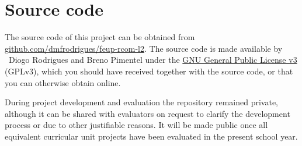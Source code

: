 \documentclass[a4paper, 11pt]{report}
\begin{document}



% 
% 

\appendix
\appendixpage
\addappheadtotoc
\chapter{Source code}

The source code of this project can be obtained from \href{https://github.com/dmfrodrigues/feup-rcom-l2}{github.com/dmfrodrigues/feup-rcom-l2}.
The source code is made available by \textcopyright~Diogo Rodrigues and Breno Pimentel under the \href{https://www.gnu.org/licenses/gpl-3.0.en.html}{GNU General Public License v3} (GPLv3), which you should have received together with the source code, or that you can otherwise obtain online.

During project development and evaluation the repository remained private, although it can be shared with evaluators on request to clarify the development process or due to other justifiable reasons.
It will be made public once all equivalent curricular unit projects have been evaluated in the present school year.

\fancyhfoffset{0pt}
\end{document}
